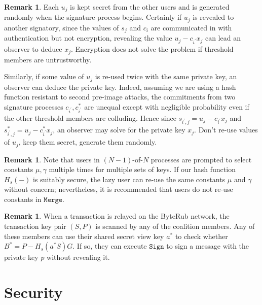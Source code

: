 \documentclass{mrl}
\theoremstyle{definition}
\newtheorem{disc}[theorem]{Remark}
\begin{document}
 
 \begin{disc}
 Each $u_j$ is kept secret from the other users and is generated randomly when the signature process begins. Certainly if $u_j$ is revealed to another signatory, since the values of $s_j$ and $c_i$ are communicated in with authentication but not encryption, revealing the value $u_j - c_{i^{\prime}} x_j$ can lead an observer to deduce $x_j$. Encryption does not solve the problem if threshold members are untrustworthy.
 
 
 Similarly, if some value of $u_j$ is re-used twice with the same private key, an observer can deduce the private key. Indeed, assuming we are using a hash function resistant to second pre-image attacks, the commitments from two signature processes $c_{i^{\prime}}, c_{i^{\prime}}^*$ are unequal except with negligible probability even if the other threshold members are colluding. Hence since $s_{i^{\prime},j} = u_j - c_{i^{\prime}} x_{j}$ and $s_{i^{\prime},j}^* = u_j - c_{i^{\prime}}^* x_{j}$, an observer may solve for the private key $x_j$. Don't re-use values of $u_j$, keep them secret, generate them randomly.
 
 \end{disc}
 
 \begin{disc}  Note that users in $(N-1)$-of-$N$ processes are prompted to select constants $\mu, \gamma$ multiple times for multiple sets of keys. If our hash function $H_s(-)$ is suitably secure, the lazy user can re-use the same constants $\mu$ and $\gamma$ without concern; nevertheless, it is recommended that users do not re-use constants in $\texttt{Merge}$. 
 \end{disc}
 
 \begin{disc}
 When a transaction is relayed on the ByteRub network, the transaction key pair $(S,P)$ is scanned by any of the coalition members. Any of these members can use their shared secret view key $a^*$ to check whether $B^* = P - H_s(a^* S)G$. If so, they can execute $\texttt{Sign}$ to sign a message with the private key $p$ without revealing it.
 \end{disc}
 
 
 \section{Security}
 
 
\end{document}
